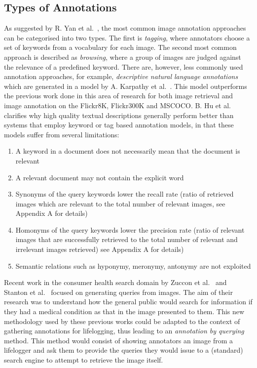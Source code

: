 \subsection{Types of Annotations}
As suggested by R. Yan et al.~\cite{yan2008learning}, the most common image annotation approaches can be categorised into two types. The first is \textit{tagging}, where annotators choose a set of keywords from a vocabulary for each image. The second most common approach is described as \textit{browsing}, where a group of images are judged against the relevance of a predefined keyword. There are, however, less commonly used annotation approaches, for example, \textit{descriptive natural language annotations} which are generated in a model by A. Karpathy et al.~\cite{karpathy2015deep}. This model outperforms the previous work done in this area of research for both image retrieval and image annotation on the Flickr8K, Flickr300K and MSCOCO. B. Hu et al.~\cite{hu2003ontology} clarifies why high quality textual descriptions generally perform better than systems that employ keyword or tag based annotation models, in that these models suffer from several limitations:
\begin{enumerate}
    \item A keyword in a document does not necessarily mean that the document is relevant
    \item A relevant document may not contain the explicit word
    \item Synonyms of the query keywords lower the recall rate (ratio of retrieved images which are relevant to the total number of relevant images, see Appendix A for details)
    \item Homonyms of the query keywords lower the precision rate  (ratio of relevant images that are successfully retrieved to the total number of relevant and irrelevant images retrieved) see Appendix A for details)
    \item Semantic relations such as hyponymy, meronymy, antonymy are not exploited
\end{enumerate}

Recent work in the consumer health search domain by Zuccon et al.~\cite{quteprints82599} and Stanton et al.~\cite{stanton2014circumlocution} focused on generating queries from images. The aim of their research was to understand how the general public would search for information if they had a medical condition as that in the image presented to them. This new methodology used by these previous works could be adapted to the context of gathering annotations for lifelogging, thus leading to an \textit{annotation by querying} method. This method would consist of showing annotators an image from a lifelogger and ask them to provide the queries they would issue to a (standard) search engine to attempt to retrieve the image itself.

